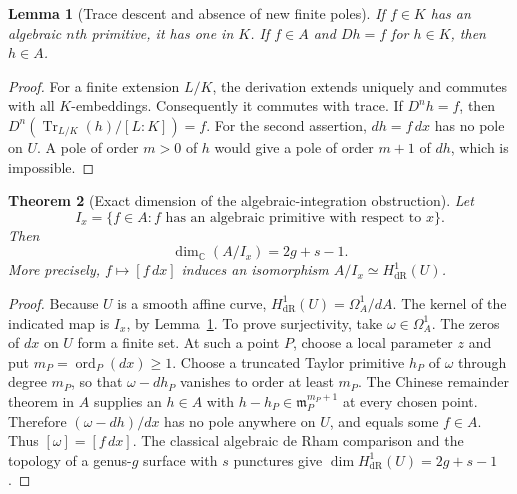\documentclass[11pt,a4paper]{article}
\newtheorem{theorem}{Theorem}[section]
\newtheorem{lemma}[theorem]{Lemma}
\theoremstyle{definition}
\theoremstyle{remark}
\numberwithin{equation}{section}
\begin{document}
\begin{lemma}[Trace descent and absence of new finite poles]
\label{geom:trace}
If $f\in K$ has an algebraic $n$th primitive, it has one in $K$.
If $f\in A$ and $Dh=f$ for $h\in K$, then $h\in A$.
\end{lemma}
\begin{proof}
For a finite extension $L/K$, the derivation extends uniquely and
commutes with all $K$-embeddings. Consequently it commutes with trace.
If $D^n h=f$, then $D^n(\operatorname{Tr}_{L/K}(h)/[L:K])=f$.
For the second assertion, $dh=f\,dx$ has no pole on $U$. A pole of
order $m>0$ of $h$ would give a pole of order $m+1$ of $dh$, which
is impossible.
\end{proof}

\begin{theorem}[Exact dimension of the algebraic-integration obstruction]
\label{geom:codim}
Let
\[
 I_x=\{f\in A: f\text{ has an algebraic primitive with respect to }x\}.
\]
Then
\[
 \boxed{\quad \dim_{\mathbb C}(A/I_x)=2g+s-1.\quad}
\]
More precisely, $f\mapsto[f\,dx]$ induces an isomorphism
$A/I_x\simeq H^1_{\mathrm{dR}}(U)$.
\end{theorem}
\begin{proof}
Because $U$ is a smooth affine curve,
$H^1_{\mathrm{dR}}(U)=\Omega^1_A/dA$. The kernel of the indicated map
is $I_x$, by Lemma~\ref{geom:trace}.
To prove surjectivity, take $\omega\in\Omega^1_A$.
The zeros of $dx$ on $U$ form a finite set. At such a point $P$, choose
a local parameter $z$ and put $m_P=\operatorname{ord}_P(dx)\ge1$.
Choose a truncated Taylor primitive $h_P$ of $\omega$ through degree
$m_P$, so that $\omega-dh_P$ vanishes to order at least $m_P$.
The Chinese remainder theorem in $A$ supplies an $h\in A$ with
$h-h_P\in\mathfrak m_P^{m_P+1}$ at every chosen point.
Therefore $(\omega-dh)/dx$ has no pole anywhere on $U$, and equals
some $f\in A$. Thus $[\omega]=[f\,dx]$.
The classical algebraic de Rham comparison and the topology of a
genus-$g$ surface with $s$ punctures give
$\dim H^1_{\mathrm{dR}}(U)=2g+s-1$.
\end{proof}
\end{document}
